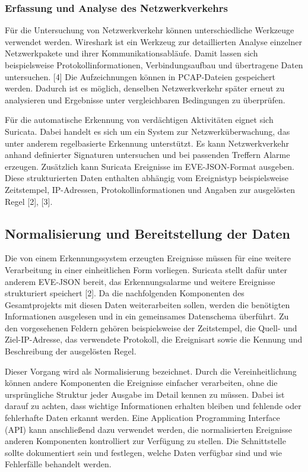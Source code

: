 \subsubsection{Erfassung und Analyse des Netzwerkverkehrs}

Für die Untersuchung von Netzwerkverkehr können unterschiedliche Werkzeuge verwendet werden. Wireshark ist ein Werkzeug zur detaillierten Analyse einzelner Netzwerkpakete und ihrer Kommunikationsabläufe. Damit lassen sich beispielsweise Protokollinformationen, Verbindungsaufbau und übertragene Daten untersuchen. [4] Die Aufzeichnungen können in PCAP-Dateien gespeichert werden. Dadurch ist es möglich, denselben Netzwerkverkehr später erneut zu analysieren und Ergebnisse unter vergleichbaren Bedingungen zu überprüfen.

Für die automatische Erkennung von verdächtigen Aktivitäten eignet sich Suricata. Dabei handelt es sich um ein System zur Netzwerküberwachung, das unter anderem regelbasierte Erkennung unterstützt. Es kann Netzwerkverkehr anhand definierter Signaturen untersuchen und bei passenden Treffern Alarme erzeugen. Zusätzlich kann Suricata Ereignisse im EVE-JSON-Format ausgeben. Diese strukturierten Daten enthalten abhängig vom Ereignistyp beispielsweise Zeitstempel, IP-Adressen, Protokollinformationen und Angaben zur ausgelösten Regel [2], [3].

\subsection{Normalisierung und Bereitstellung der Daten}

Die von einem Erkennungssystem erzeugten Ereignisse müssen für eine weitere Verarbeitung in einer einheitlichen Form vorliegen. Suricata stellt dafür unter anderem EVE-JSON bereit, das Erkennungsalarme und weitere Ereignisse strukturiert speichert [2]. Da die nachfolgenden Komponenten des Gesamtprojekts mit diesen Daten weiterarbeiten sollen, werden die benötigten Informationen ausgelesen und in ein gemeinsames Datenschema überführt. Zu den vorgesehenen Feldern gehören beispielsweise der Zeitstempel, die Quell- und Ziel-IP-Adresse, das verwendete Protokoll, die Ereignisart sowie die Kennung und Beschreibung der ausgelösten Regel.

Dieser Vorgang wird als Normalisierung bezeichnet. Durch die Vereinheitlichung können andere Komponenten die Ereignisse einfacher verarbeiten, ohne die ursprüngliche Struktur jeder Ausgabe im Detail kennen zu müssen. Dabei ist darauf zu achten, dass wichtige Informationen erhalten bleiben und fehlende oder fehlerhafte Daten erkannt werden. Eine Application Programming Interface (API) kann anschließend dazu verwendet werden, die normalisierten Ereignisse anderen Komponenten kontrolliert zur Verfügung zu stellen. Die Schnittstelle sollte dokumentiert sein und festlegen, welche Daten verfügbar sind und wie Fehlerfälle behandelt werden.

